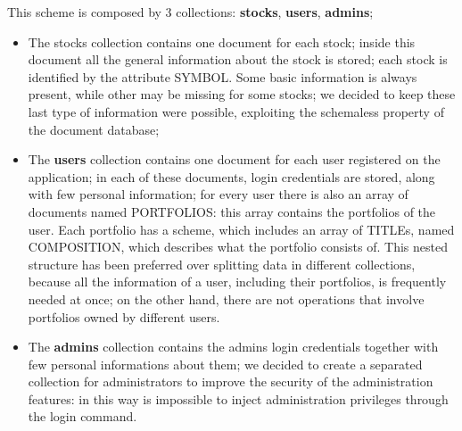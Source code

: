 \hfill \break
This scheme is composed by 3 collections: \textbf{stocks}, \textbf{users}, \textbf{admins};
\begin{itemize}
    \item
The stocks collection contains one document for each stock; inside this document
all the general information about the stock is stored; each stock is identified by the attribute SYMBOL.
Some basic information is always present, while other may be missing for some stocks; we decided 
to keep these last type of information were possible, exploiting the schemaless property of
the document database;
    \item
The \textbf{users} collection contains one document for each user registered on the application; in each of these documents, login credentials are stored, along with few personal information; for every user there is
also an array of documents named PORTFOLIOS: this array contains the portfolios of the user.
Each portfolio has a scheme, which includes an array of TITLEs, named COMPOSITION, which describes
what the portfolio consists of. This nested structure has been preferred over splitting
data in different collections, because all the information of a user, including their portfolios, 
is frequently needed at once; on the other hand, there are not operations that involve
portfolios owned by different users.
    \item 
The \textbf{admins} collection contains the admins login credentials together with few personal
informations about them; we decided to create a separated collection for administrators 
to improve the security of the administration features: in this way is impossible to inject
administration privileges through the login command.
\end{itemize}
